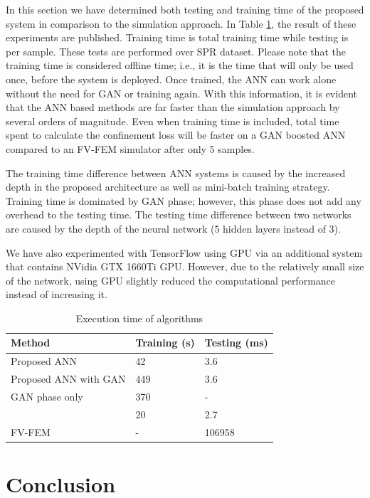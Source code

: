 \documentclass[10pt]{IEEEtran}
\begin{document}
In this section we have determined both testing and training time of the proposed system in comparison to the simulation approach. In Table \ref{tbl:timing}, the result of these experiments are published. Training time is total training time while testing is per sample. These tests are performed over SPR dataset. Please note that the training time is considered offline time; i.e., it is the time that will only be used once, before the system is deployed. Once trained, the ANN can work alone without the need for GAN or training again. With this information, it is evident that the ANN based methods are far faster than the simulation approach by several orders of magnitude. Even when training time is included, total time spent to calculate the confinement loss will be faster on a GAN boosted ANN compared to an FV-FEM simulator after only 5 samples.

The training time difference between ANN systems is caused by the increased depth in the proposed architecture as well as mini-batch training strategy. Training time is dominated by GAN phase; however, this phase does not add any overhead to the testing time. The testing time difference between two networks are caused by the depth of the neural network (5 hidden layers instead of 3). 

We have also experimented with TensorFlow using GPU via an additional system that contains NVidia GTX 1660Ti GPU. However, due to the relatively small size of the network, using GPU slightly reduced the computational performance instead of increasing it.

\begin{table}
\caption{Execution time of algorithms}
\begin{tabular}{l|l|l}
Method    			  &  Training (s) & Testing (ms) \\\hline
Proposed ANN 		  &  42 & 3.6 \\
Proposed ANN with GAN & 449 & 3.6 \\
GAN phase only        & 370 &  -  \\
\cite{paper0}		  &  20 & 2.7 \\
FV-FEM		   		  &  -  & 106958
\end{tabular}
\label{tbl:timing}
\end{table}

\section{Conclusion}
\label{sec:conc}
\end{document}
